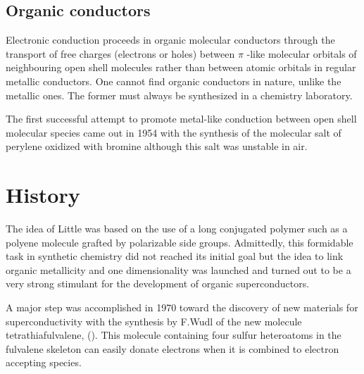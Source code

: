 \documentclass[11pt]{article} %
\begin{document}
\subsection{Organic  conductors}
 Electronic conduction proceeds in organic molecular conductors through the transport of free charges (electrons or holes) between $\pi$ -like molecular orbitals of neighbouring open shell molecules rather than between  atomic orbitals in regular metallic conductors.  One cannot find organic conductors in nature, unlike the metallic ones. The former must always  be  synthesized in a chemistry laboratory.  


The first successful  attempt  to
promote metal-like conduction between open shell molecular species came out in 1954 with the synthesis of the molecular salt of
perylene oxidized with bromine \cite{Akamatsu54} although this salt was  unstable in air.
\section{History}
The idea of Little  was based on the use of a long conjugated polymer such as a
polyene molecule grafted by polarizable side groups\cite{Little70}. Admittedly, this formidable
task in synthetic chemistry did not reached its initial goal but the idea to link organic metallicity and one dimensionality  was
launched and turned out to be a very strong stimulant for the development of organic superconductors. 


A major step was accomplished in 1970 toward the discovery of new materials for superconductivity with the synthesis by F.Wudl\cite{Wudl70} of the new molecule tetrathiafulvalene, (\ttf).
This molecule 
containing four sulfur  heteroatoms in the fulvalene skeleton can easily donate electrons when it is combined to electron accepting species.
\end{document}
